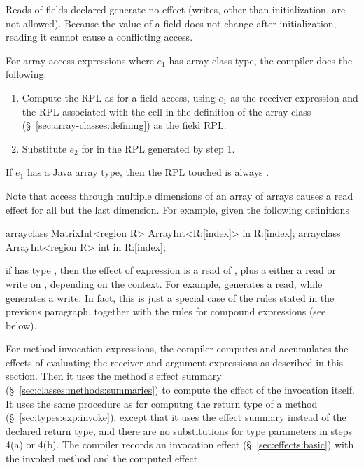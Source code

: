 Reads of fields declared  generate no effect (writes, other
than initialization, are not allowed).  Because the value of
a  field does not change after initialization, reading it
cannot cause a conflicting access.

 For array access expressions 
where $e_1$ has array class type, the compiler does the following:
%
\begin{enumerate}
%
\item Compute the RPL as for a field access, using $e_1$ as the
  receiver expression and the RPL associated with the cell in the
  definition of the array class (\S~\ref{sec:array-classes:defining})
  as the field RPL.
%
\item Substitute $e_2$ for  in the RPL generated by step 1.
%
\end{enumerate}
%
If $e_1$ has a Java array type, then the RPL touched is always
.

Note that access through multiple dimensions of an array of arrays
causes a read effect for all but the last dimension.  For example,
given the following definitions
%
\begin{dpjlisting}
arrayclass MatrixInt<region R> {
  ArrayInt<R:[index]> in R:[index];
}
arrayclass ArrayInt<region R> {
  int in R:[index];
}
\end{dpjlisting}
%
if  has type , then the effect of expression
 is a read of \kwd{[0]}, plus a either a read or write on
\kwd{[0]:[1]}, depending on the context.  For example,  generates a read, while  generates a
write.  In fact, this is just a special case of the rules stated in
the previous paragraph, together with the rules for compound
expressions (see below).

 For method invocation expressions, the
compiler computes and accumulates the effects of evaluating the
receiver and argument expressions as described in this section.  Then
it uses the method's effect summary
(\S~\ref{sec:classes:methods:summaries}) to compute the effect of the
invocation itself.  It uses the same procedure as for computng the
return type of a method (\S~\ref{sec:types:exp:invoke}), except that
it uses the effect summary instead of the declared return type, and
there are no substitutions for type parameters in steps 4(a) or 4(b).
The compiler records an invocation effect (\S~\ref{sec:effects:basic})
with the invoked method and the computed effect.

